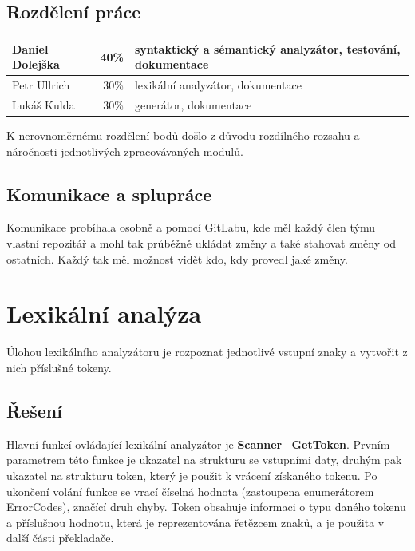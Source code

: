 \documentclass[a4paper,11pt]{article}
\begin{document}
\subsection{Rozdělení práce} \label{podrobnosti-rozdeleni}
\noindent
\renewcommand{\arraystretch}{1.2}
\begin{tabular}{ l r l }
	\hline
	Daniel Dolejška	& 40\%	& syntaktický a sémantický analyzátor, testování, dokumentace \\ \hline
	Petr Ullrich	& 30\%	& lexikální analyzátor, dokumentace \\ \hline
	Lukáš Kulda		& 30\%	& generátor, dokumentace \\
	\hline
\end{tabular}

\vspace{4mm}
K nerovnoměrnému rozdělení bodů došlo z důvodu rozdílného rozsahu a náročnosti jednotlivých zpracovávaných modulů.

\subsection{Komunikace a splupráce} \label{podrobnosti-spoluprace}
Komunikace probíhala osobně a pomocí GitLabu, kde měl každý člen týmu vlastní repozitář a mohl tak průběžně ukládat změny a také stahovat změny od ostatních. Každý tak měl možnost vidět kdo, kdy provedl jaké změny.

\newpage
\section{Lexikální analýza} \label{lex}
Úlohou lexikálního analyzátoru je rozpoznat jednotlivé vstupní znaky a vytvořit z nich příslušné tokeny.

\subsection{Řešení} \label{lex-reseni}
Hlavní funkcí ovládající lexikální analyzátor je \textbf{Scanner\_GetToken}. Prvním parametrem této funkce je ukazatel na strukturu se vstupními daty, druhým pak ukazatel na strukturu token, který je použit k vrácení získaného tokenu. Po ukončení volání funkce se vrací číselná hodnota (zastoupena enumerátorem \textsf{ErrorCodes}), značící druh chyby. Token obsahuje informaci o typu daného tokenu a příslušnou hodnotu, která je reprezentována řetězcem znaků, a je použita v další části překladače.
\end{document}
